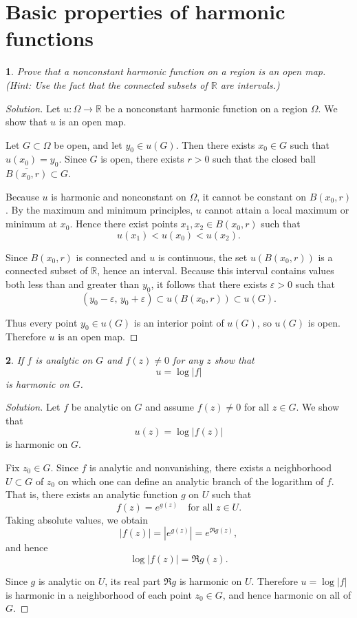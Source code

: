 \documentclass[12pt, a4paper]{report}
\theoremstyle{spaced}
\newtheorem{exercise}{}
\newcommand{\setexercise}[1]{\setcounter{exercise}{#1-1}}
\begin{document}
\section{Basic properties of harmonic functions}
\setexercise{4}
\begin{exercise}
	Prove that a nonconstant harmonic function on a region is an open map.
	(Hint: Use the fact that the connected subsets of $\mathbb{R}$ are intervals.)
\end{exercise}
\begin{proof}[Solution]
	Let \(u:\Omega \to \mathbb{R}\) be a nonconstant harmonic function on a region \(\Omega\). We show that \(u\) is an open map.

	Let \(G \subset \Omega\) be open, and let \(y_0 \in u(G)\). Then there exists \(x_0 \in G\) such that \(u(x_0)=y_0\). Since \(G\) is open, there exists \(r>0\) such that the closed ball \(\overline{B(x_0,r)} \subset G\).

	Because \(u\) is harmonic and nonconstant on \(\Omega\), it cannot be constant on \(B(x_0,r)\). By the maximum and minimum principles, \(u\) cannot attain a local maximum or minimum at \(x_0\). Hence there exist points \(x_1, x_2 \in B(x_0,r)\) such that
	\[
		u(x_1) < u(x_0) < u(x_2).
	\]

	Since \(B(x_0,r)\) is connected and \(u\) is continuous, the set \(u(B(x_0,r))\) is a connected subset of \(\mathbb{R}\), hence an interval. Because this interval contains values both less than and greater than \(y_0\), it follows that there exists \(\varepsilon > 0\) such that
	\[
		(y_0 - \varepsilon,\, y_0 + \varepsilon) \subset u(B(x_0,r)) \subset u(G).
	\]

	Thus every point \(y_0 \in u(G)\) is an interior point of \(u(G)\), so \(u(G)\) is open. Therefore \(u\) is an open map.
\end{proof}

\setexercise{5}
\begin{exercise}
	If $f$ is analytic on $G$ and $f(z)\ne 0$ for any $z$ show that
	\[
		u=\log |f|
	\]
	is harmonic on $G$.
\end{exercise}
\begin{proof}[Solution]
	Let \(f\) be analytic on \(G\) and assume \(f(z)\neq 0\) for all \(z\in G\). We show that
	\[
		u(z)=\log |f(z)|
	\]
	is harmonic on \(G\).

	Fix \(z_0\in G\). Since \(f\) is analytic and nonvanishing, there exists a neighborhood \(U\subset G\) of \(z_0\) on which one can define an analytic branch of the logarithm of \(f\). That is, there exists an analytic function \(g\) on \(U\) such that
	\[
		f(z)=e^{g(z)} \quad \text{for all } z\in U.
	\]
	Taking absolute values, we obtain
	\[
		|f(z)| = |e^{g(z)}| = e^{\Re g(z)},
	\]
	and hence
	\[
		\log |f(z)| = \Re g(z).
	\]

	Since \(g\) is analytic on \(U\), its real part \(\Re g\) is harmonic on \(U\). Therefore \(u=\log|f|\) is harmonic in a neighborhood of each point \(z_0\in G\), and hence harmonic on all of \(G\).
\end{proof}
\end{document}

